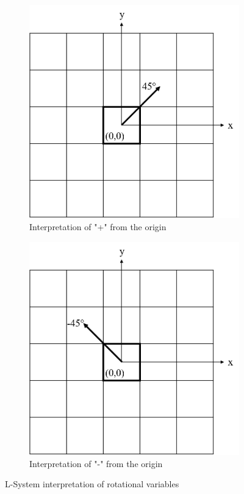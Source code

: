 \begin{figure}[H]
	\centering
	\begin{subfigure}[c]{0.4\textwidth}
		\centering
		\includegraphics[width=\textwidth]{LS+.png}
		\caption{Interpretation of "+" from the origin}
	\end{subfigure}
	\hfill
	\begin{subfigure}[c]{0.4\textwidth}
		\centering
		\includegraphics[width=\textwidth]{LS-.png}
		\caption{Interpretation of "-" from the origin}
	\end{subfigure}
	\caption{L-System interpretation of rotational variables}
	\label{fig:lsrot}
\end{figure}

